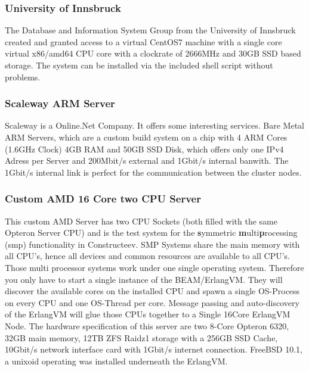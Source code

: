\subsubsection{University of Innsbruck}
The Database and Information System Group from the University of Innsbruck created and granted access to a virtual CentOS7 machine with a single core virtual x86/amd64 CPU core with a clockrate of 2666MHz and 30GB SSD based storage. The system can be installed via the included shell script without problems.

\subsubsection{Scaleway ARM Server}
Scaleway is a Online.Net Company. It offers some interesting services. Bare Metal ARM Servers, which are a custom build system on a chip with 4 ARM Cores (1.6GHz Clock) 4GB RAM and 50GB SSD Disk, which offers only one IPv4 Adress per Server and 200Mbit/s external and 1Gbit/s internal banwith. The 1Gbit/s internal link is perfect for the communication between the cluster nodes. 

\subsubsection{Custom AMD 16 Core two CPU Server} 
This custom AMD Server has two CPU Sockets (both filled with the same Opteron Server CPU) and is the test system for the \textbf{s}ymmetric \textbf{m}ulti\textbf{p}rocessing (smp) functionality in Constructeev. SMP Systems share the main memory with all CPU's, hence all devices and common resources are available to all CPU's. Those multi processor systems work under one single operating system. Therefore you only have to start a single instance of the BEAM/ErlangVM. They will discover the available cores on the installed CPU and spawn a single OS-Process on every CPU and one OS-Thread per core. Message passing and auto-discovery of the ErlangVM will glue those CPUs together to a Single 16Core ErlangVM Node. The hardware specification of this server are two 8-Core Opteron 6320, 32GB main memory, 12TB ZFS Raidz1 storage with a 256GB SSD Cache, 10Gbit/s network interface card with 1Gbit/s internet connection. FreeBSD 10.1, a unixoid operating was installed underneath the ErlangVM.

